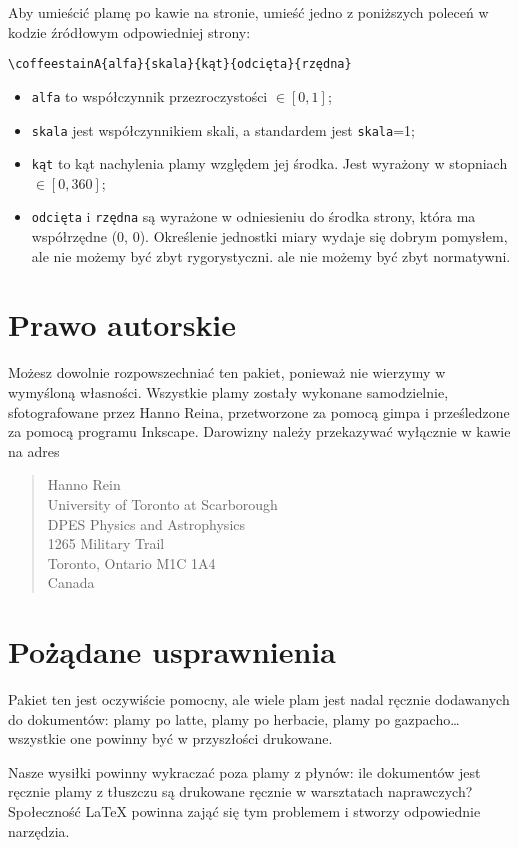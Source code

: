 \documentclass[a4paper, 11pt, BCOR = 0 pt, DIV = 11, oneside]{scrartcl}
\begin{document}
Aby umieścić plamę po kawie na stronie, umieść jedno z poniższych poleceń w kodzie źródłowym odpowiedniej strony: 
\begin{verbatim}
\coffeestainA{alfa}{skala}{kąt}{odcięta}{rzędna}
\end{verbatim}

\begin{itemize}
\item \texttt{alfa} to współczynnik przezroczystości $\in [0,1]$;
\item \texttt{skala} jest współczynnikiem skali, a standardem jest \texttt{skala}=1;
\item \texttt{kąt} to kąt nachylenia plamy względem jej środka. Jest wyrażony w stopniach $\in [0,360]$;
\item \texttt{odcięta} i \texttt{rzędna} są wyrażone w odniesieniu do środka
  strony, która ma współrzędne (0, 0). Określenie jednostki miary wydaje się
  dobrym pomysłem, ale nie możemy być zbyt rygorystyczni. ale nie możemy być
  zbyt normatywni.
\end{itemize}


\section{Prawo autorskie}
Możesz dowolnie rozpowszechniać ten pakiet, ponieważ nie wierzymy w wymyśloną
własności. Wszystkie plamy zostały wykonane samodzielnie, sfotografowane przez
Hanno Reina, przetworzone za pomocą gimpa i prześledzone za pomocą programu
Inkscape. Darowizny należy przekazywać wyłącznie w kawie na adres
\begin{quote}
Hanno Rein\\
University of Toronto at Scarborough\\
DPES Physics and Astrophysics\\
1265 Military Trail\\
Toronto, Ontario M1C 1A4\\
Canada
\end{quote}

\section{Pożądane usprawnienia}
Pakiet ten jest oczywiście pomocny, ale wiele plam jest nadal ręcznie dodawanych
do dokumentów: plamy po latte, plamy po herbacie, plamy po
gazpacho\dots{} wszystkie one powinny być w przyszłości drukowane.

Nasze wysiłki powinny wykraczać poza plamy z płynów: ile dokumentów jest ręcznie
plamy z tłuszczu są drukowane ręcznie w warsztatach naprawczych? Społeczność
\LaTeX{} powinna zająć się tym problemem i stworzy odpowiednie narzędzia.
\end{document}
